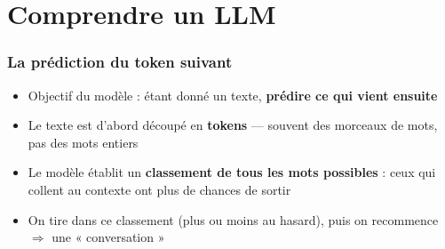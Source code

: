 \documentclass[
	11pt,
	aspectratio=169
]{beamer}
\begin{document}
\section{Comprendre un LLM}

\begin{frame}
    \frametitle{La prédiction du token suivant}
    \begin{itemize}\setlength\itemsep{0.5em}
        \item Objectif du modèle : étant donné un texte, \textbf{prédire ce qui vient ensuite}
        \item Le texte est d'abord découpé en \textbf{tokens} --- souvent des morceaux de mots, pas des mots entiers
        \item Le modèle établit un \textbf{classement de tous les mots possibles} : ceux qui collent au contexte ont plus de chances de sortir
        \item On tire dans ce classement (plus ou moins au hasard), puis on recommence $\Rightarrow$ une « conversation »
    \end{itemize}
    \vfill
    \begin{center}
    \end{center}
\end{frame}
\end{document}

